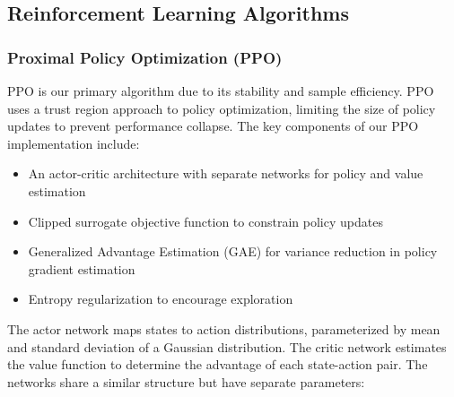 \documentclass[12pt]{article}
\begin{document}

\subsection{Reinforcement Learning Algorithms}
\subsubsection{Proximal Policy Optimization (PPO)}

PPO is our primary algorithm due to its stability and sample efficiency. PPO uses a trust region approach to policy optimization, limiting the size of policy updates to prevent performance collapse. The key components of our PPO implementation include:


\begin{itemize}
    \item An actor-critic architecture with separate networks for policy and value estimation
    \item Clipped surrogate objective function to constrain policy updates
    \item Generalized Advantage Estimation (GAE) for variance reduction in policy gradient estimation
    \item Entropy regularization to encourage exploration
\end{itemize}


The actor network maps states to action distributions, parameterized by mean and standard deviation of a Gaussian distribution. The critic network estimates the value function to determine the advantage of each state-action pair. The networks share a similar structure but have separate parameters:
\end{document}
